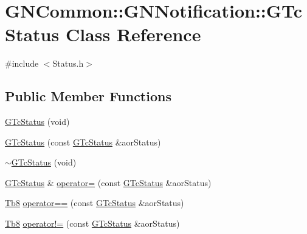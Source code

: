 \hypertarget{class_g_n_common_1_1_g_n_notification_1_1_g_tc_status}{}\section{G\+N\+Common\+:\+:G\+N\+Notification\+:\+:G\+Tc\+Status Class Reference}
\label{class_g_n_common_1_1_g_n_notification_1_1_g_tc_status}


{\ttfamily \#include $<$Status.\+h$>$}

\subsection*{Public Member Functions}
\begin{DoxyCompactItemize}
\item 
\mbox{\hyperlink{class_g_n_common_1_1_g_n_notification_1_1_g_tc_status_a5531fe8477d9e8db2a947ab469f63bac}{G\+Tc\+Status}} (void)
\item 
\mbox{\hyperlink{class_g_n_common_1_1_g_n_notification_1_1_g_tc_status_a363ddae78b925a4e34a1ebe09bf27854}{G\+Tc\+Status}} (const \mbox{\hyperlink{class_g_n_common_1_1_g_n_notification_1_1_g_tc_status}{G\+Tc\+Status}} \&aor\+Status)
\item 
\mbox{\hyperlink{class_g_n_common_1_1_g_n_notification_1_1_g_tc_status_a654abd2ada87cd45ed58d00212c58455}{$\sim$\+G\+Tc\+Status}} (void)
\item 
\mbox{\hyperlink{class_g_n_common_1_1_g_n_notification_1_1_g_tc_status}{G\+Tc\+Status}} \& \mbox{\hyperlink{class_g_n_common_1_1_g_n_notification_1_1_g_tc_status_a5e0b5d58cf5c0f12bf78f2d06289c879}{operator=}} (const \mbox{\hyperlink{class_g_n_common_1_1_g_n_notification_1_1_g_tc_status}{G\+Tc\+Status}} \&aor\+Status)
\item 
\mbox{\hyperlink{namespace_g_n_common_a8115dc7ed53b6e5b52e6bfde1632ea74}{Tb8}} \mbox{\hyperlink{class_g_n_common_1_1_g_n_notification_1_1_g_tc_status_a4a6e0ea098233c1e73b86136327e4483}{operator==}} (const \mbox{\hyperlink{class_g_n_common_1_1_g_n_notification_1_1_g_tc_status}{G\+Tc\+Status}} \&aor\+Status)
\item 
\mbox{\hyperlink{namespace_g_n_common_a8115dc7ed53b6e5b52e6bfde1632ea74}{Tb8}} \mbox{\hyperlink{class_g_n_common_1_1_g_n_notification_1_1_g_tc_status_aceaacd5106b630333a97ec3a592b7ebb}{operator!=}} (const \mbox{\hyperlink{class_g_n_common_1_1_g_n_notification_1_1_g_tc_status}{G\+Tc\+Status}} \&aor\+Status)
\end{DoxyCompactItemize}
